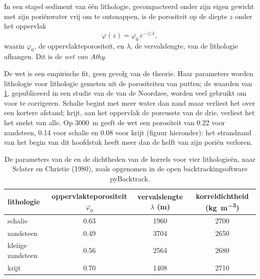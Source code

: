 \begin{proposition}\label{prop:b1:diagenesis-basins:athy}
In een stapel sediment van één lithologie, gecompacteerd onder zijn eigen gewicht met zijn poriënwater vrij om te ontsnappen, is de porositeit op de diepte $z$ onder het oppervlak
\[
  \varphi(z) = \varphi_0\, e^{-z/\lambda},
\]
waarin $\varphi_0$, de oppervlakteporositeit, en $\lambda$, de vervalslengte, van de lithologie afhangen. Dit is de \emph{wet van Athy}.
\end{proposition}
\admitted

De wet is een empirische fit, geen gevolg van de theorie. Haar parameters worden lithologie voor lithologie gemeten uit de porositeiten van putten; de waarden van \cref{tab:b1:diagenesis-basins:athy}, gepubliceerd in een studie van de  van de Noordzee, worden veel gebruikt om voor  te corrigeren. Schalie begint met meer water dan zand maar verliest het over een kortere afstand; krijt, aan het oppervlak de poreusste van de drie, verliest het het snelst van alle. Op \qty{3000}{m} geeft de wet een porositeit van \num{0.22} voor zandsteen, \num{0.14} voor schalie en \num{0.08} voor krijt (figuur hieronder): het strandzand van het begin van dit hoofdstuk heeft meer dan de helft van zijn poriën verloren.

\begin{table}[htbp]
\centering
\begin{tabular}{lccc}
\hline
lithologie & oppervlakteporositeit $\varphi_0$ & vervalslengte $\lambda$ (m) & korreldichtheid (\unit{kg.m^{-3}}) \\
\hline
schalie            & 0.63 & 1960 & 2700 \\
zandsteen          & 0.49 & 3704 & 2650 \\
kleiige zandsteen  & 0.56 & 2564 & 2680 \\
krijt              & 0.70 & 1408 & 2710 \\
\hline
\end{tabular}
\caption{De parameters van de  en de dichtheden van de korrels voor vier lithologieën, naar Sclater en Christie (1980), zoals opgenomen in de open backtrackingsoftware pyBacktrack.}
\label{tab:b1:diagenesis-basins:athy}
\end{table}

